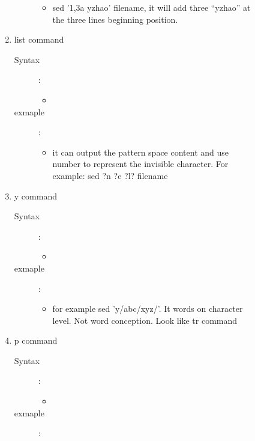 \documentclass[a4paper,12pt,twoside]{book}
\begin{document}
\begin{CJK*}{UTF8}{song}
\begin{description}
\begin{description}
\begin{enumerate}
\begin{description}
						\begin{itemize}
						\item sed '1,3a
							yzhao' filename, it will add three ``yzhao'' at the three lines beginning position.
						\end{itemize}
					\end{description}	
				\item list command
					\begin{description}
					\item[Syntax]: \\
						\begin{itemize}
						\item
						\end{itemize}
					\item[exmaple]: \\
						\begin{itemize}
						\item it can output the pattern space content and use number to represent the invisible character. For example: sed ?n ?e ?l? filename
						\end{itemize}
					\end{description}
				\item y command
					\begin{description}
					\item[Syntax]: \\
						\begin{itemize}
						\item
						\end{itemize}
					\item[exmaple]: \\
						\begin{itemize}
						\item for example sed 'y/abc/xyz/'. It words on character level. Not word conception. Look like tr command
						\end{itemize}
					\end{description}
				\item p command
					\begin{description}
					\item[Syntax]: \\
						\begin{itemize}
						\item
						\end{itemize}
					\item[exmaple]: \\
						\begin{itemize}

\end{itemize}
\end{description}
\end{enumerate}
\end{description}
\end{description}
\end{CJK*}
\end{document}

